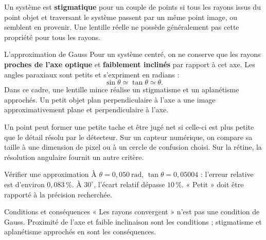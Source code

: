 Un système est \textbf{stigmatique} pour un couple de points si tous les rayons issus du point objet et traversant le système passent par un même point image, ou semblent en provenir. Une lentille réelle ne possède généralement pas cette propriété pour tous les rayons.
\begin{loi}{L'approximation de Gauss}
Pour un système centré, on ne conserve que les rayons \textbf{proches de l'axe optique} et \textbf{faiblement inclinés} par rapport à cet axe. Les angles paraxiaux sont petits et s'expriment en radians :
\[\sin\theta\simeq\tan\theta\simeq\theta.\]
Dans ce cadre, une lentille mince réalise un stigmatisme et un aplanétisme approchés. Un petit objet plan perpendiculaire à l'axe a une image approximativement plane et perpendiculaire à l'axe.
\end{loi}
Un point peut former une petite tache et être jugé net si celle-ci est plus petite que le détail résolu par le détecteur. Sur un capteur numérique, on compare sa taille à une dimension de pixel ou à un cercle de confusion choisi. Sur la rétine, la résolution angulaire fournit un autre critère.
\begin{methode}{Vérifier une approximation}
À $\theta=0{,}050\ \mathrm{rad}$, $\tan\theta=0{,}05004$ : l'erreur relative est d'environ $0{,}083\,\%$. À $30^\circ$, l'écart relatif dépasse $10\,\%$. « Petit » doit être rapporté à la précision recherchée.
\end{methode}
\begin{piege}{Conditions et conséquences}
« Les rayons convergent » n'est pas une condition de Gauss. Proximité de l'axe et faible inclinaison sont les conditions ; stigmatisme et aplanétisme approchés en sont les conséquences.
\end{piege}

